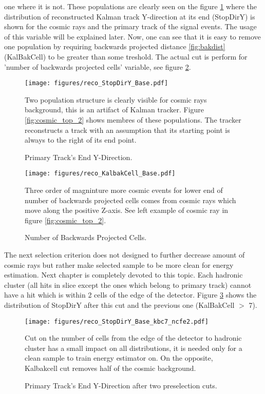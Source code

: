 one where it is not. These populations are clearly seen on the figure \ref{fig:stopdiry_1} where the distribution
of reconstructed Kalman track Y-direction at its end (StopDirY) is shown for the cosmic rays and the primary 
track of the signal events. The usage of this variable will be explained later. Now, one can see that it 
is easy to remove one population by requiring backwards projected distance \ref{fig:bakdist} (KalBakCell) to 
be greater than some treshold. The actual cut is perform for 'number of backwards projected cells' variable, 
see figure \ref{fig:kalbakcell}.
\begin{figure}[h]
\centering
\texttt{[image: figures/reco\_StopDirY\_Base.pdf]}
\caption{Primary Track's End Y-Direction.}
{Two population structure is clearly visible for cosmic rays background, this is an artifact of Kalman tracker.
Figure \ref{fig:cosmic_top_2} shows membres of these populations. The tracker reconstructs a track with an assumption 
that its starting point is always to the right of its end point. }
\label{fig:stopdiry_1}
\end{figure}
\begin{figure}[h]
\centering
\texttt{[image: figures/reco\_KalbakCell\_Base.pdf]}
\caption{Number of Backwards Projected Cells.}
{Three order of magninture more cosmic events for lower end of number of backwards projected cells comes from cosmic 
rays which move along the positive Z-axis. See left example of cosmic ray in figure \ref{fig:cosmic_top_2}. }
\label{fig:kalbakcell}
\end{figure}

The next selection criterion does not designed to further decrease amount of cosmic rays but rather make selected sample 
to be more clean for energy estimation. Next chapter is completely devoted to this topic. Each
hadronic cluster (all hits in slice except the ones which belong to primary track) cannot have a hit which is within
2 cells of the edge of the detector. Figure \ref{fig:stopdiry_2} shows the
distribution of StopDirY after this cut and the previous one (KalBakCell $>$ 7).
\begin{figure}[h]
\centering
\texttt{[image: figures/reco\_StopDirY\_Base\_kbc7\_ncfe2.pdf]}
\caption{Primary Track's End Y-Direction after two preselection cuts.}
{Cut on the number of cells from the edge of the detector to hadronic cluster has a small impact on all distributions, 
it is needed only for a clean sample to train energy estimator on. On the opposite, Kalbakcell cut removes half of 
the cosmic background. }
\label{fig:stopdiry_2}
\end{figure} 

